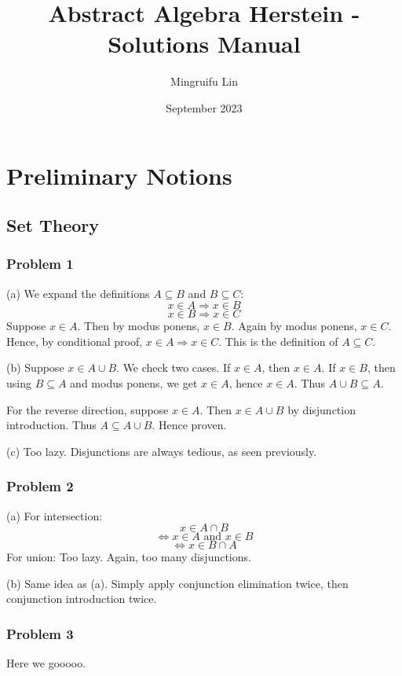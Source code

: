 \documentclass{book}
\title{Abstract Algebra Herstein - Solutions Manual}
\author{Mingruifu Lin}
\date{September 2023}
\begin{document}
\maketitle

\tableofcontents

\chapter{Preliminary Notions}

\section{Set Theory}

\subsection*{Problem 1}
(a)
We expand the definitions $A \subseteq B$ and $B \subseteq C$:
$$x \in A \Rightarrow x \in B$$
$$x \in B \Rightarrow x \in C$$
Suppose $x \in A$. Then by modus ponens, $x \in B$. Again by modus ponens, $x \in C$. Hence, by conditional proof, $x \in A \Rightarrow x \in C$. This is the definition of $A \subseteq C$.

\noindent
(b)
Suppose $x \in A \cup B$. We check two cases. If $x \in A$, then $x \in A$. If $x \in B$, then using $B \subseteq A$ and modus ponens, we get $x \in A$, hence $x \in A$. Thus $A \cup B \subseteq A$.

For the reverse direction, suppose $x \in A$. Then $x \in A \cup B$ by disjunction introduction. Thus $A \subseteq A \cup B$. Hence proven.

\noindent
(c)
Too lazy. Disjunctions are always tedious, as seen previously.

\subsection*{Problem 2}
(a)
For intersection:
$$x \in A \cap B$$
$$\Leftrightarrow x \in A \text{ and } x \in B$$
$$\Leftrightarrow x \in B \cap A$$
For union: Too lazy. Again, too many disjunctions.

\noindent
(b)
Same idea as (a). Simply apply conjunction elimination twice, then conjunction introduction twice.

\subsection*{Problem 3}
Here we gooooo.
\end{document}
